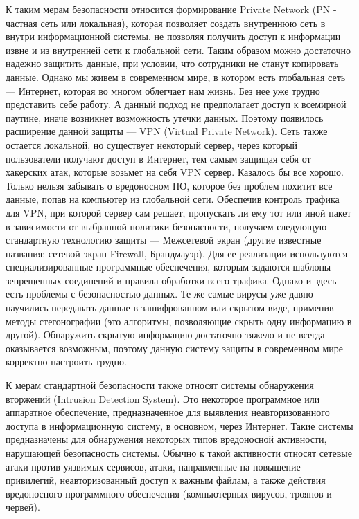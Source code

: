 К таким мерам безопасности относится формирование Private Network (PN - частная сеть или локальная), которая позволяет создать внутреннюю сеть в внутри информационной системы, не позволяя получить доступ к информации извне и из внутренней сети к глобальной сети. Таким образом можно достаточно надежно защитить данные, при условии, что сотрудники не станут копировать данные. Однако мы живем в современном мире, в котором есть глобальная сеть --- Интернет, которая во многом облегчает нам жизнь. Без нее уже трудно представить себе работу. А данный подход не предполагает доступ к всемирной паутине, иначе возникнет возможность утечки данных. Поэтому появилось расширение данной защиты --- VPN (Virtual Private Network). Сеть также остается локальной, но существует некоторый сервер, через который пользователи получают доступ в Интернет, тем самым защищая себя от хакерских атак, которые возьмет на себя VPN сервер. Казалось бы все хорошо. Только нельзя забывать о вредоносном ПО, которое без проблем похитит все данные, попав на компьютер из глобальной сети. Обеспечив контроль трафика для VPN, при которой сервер сам решает, пропускать ли ему тот или иной пакет в зависимости от выбранной политики безопасности, получаем следующую стандартную технологию защиты --- Межсетевой экран (другие известные названия: сетевой экран Firewall, Брандмауэр). Для ее реализации используются специализированные программные обеспечения, которым задаются шаблоны зепрещенных соединений и правила обработки всего трафика. Однако и здесь есть проблемы с безопасностью данных. Те же самые вирусы уже давно научились передавать данные в зашифрованном или скрытом виде, применив методы стегонографии (это алгоритмы, позволяющие скрыть одну информацию в другой). Обнаружить скрытую информацию достаточно тяжело и не всегда оказывается возможным, поэтому данную систему защиты в современном мире корректно настроить трудно.

К мерам стандартной безопасности также относят системы обнаружения вторжений (Intrusion Detection System). Это некоторое программное или аппаратное обеспечение, предназначенное для выявления неавторизованного доступа в информационную систему, в основном, через Интернет. Такие системы предназначены для обнаружения некоторых типов вредоносной активности, нарушающей безопасность системы. Обычно к такой активности относят сетевые атаки против уязвимых сервисов, атаки, направленные на повышение привилегий, неавторизованный доступ к важным файлам, а также действия вредоносного программного обеспечения (компьютерных вирусов, троянов и червей).

